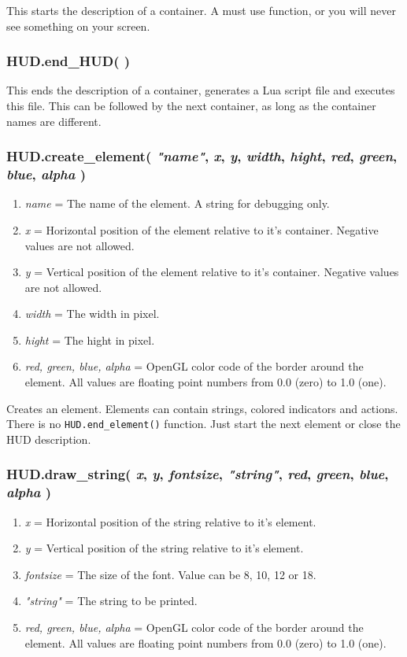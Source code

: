 \documentclass[11pt,parskip=half,a4paper]{scrartcl}
\begin{document}
This starts the description of a container. A must use function, or you will never see something on your screen.

\subsubsection{HUD.end\_HUD( )}

This ends the description of a container, generates a Lua script file and executes this file. This can be followed by the next container, as long as the container names are different.

\subsubsection{HUD.create\_element(  \emph{"name"}, \emph{x}, \emph{y}, \emph{width}, \emph{hight}, \emph{red}, \emph{green}, \emph{blue}, \emph{alpha} )}

\begin{enumerate}
	\item \emph{name} = The name of the element. A string for debugging only.
	\item \emph{x} = Horizontal position of the element relative to it's container. Negative values are not allowed.
	\item \emph{y} = Vertical position of the element relative to it's container. Negative values are not allowed.
	\item \emph{width} = The width in pixel.
	\item \emph{hight} = The hight in pixel.
	\item \emph{red, green, blue, alpha} = OpenGL color code of the border around the element. All values are floating point numbers from 0.0 (zero) to 1.0 (one).
\end{enumerate}

Creates an element. Elements can contain strings, colored indicators and actions. There is no \verb|HUD.end_element()| function. Just start the next element or close the HUD description.

\subsubsection{HUD.draw\_string( \emph{x}, \emph{y}, \emph{fontsize}, \emph{"string"}, \emph{red}, \emph{green}, \emph{blue}, \emph{alpha} )}

\begin{enumerate}
	\item \emph{x} = Horizontal position of the string relative to it's element.
	\item \emph{y} = Vertical position of the string relative to it's element.
	\item \emph{fontsize} = The size of the font. Value can be 8, 10, 12 or 18.
	\item \emph{"string"} = The string to be printed.
	\item \emph{red, green, blue, alpha} = OpenGL color code of the border around the element. All values are floating point numbers from 0.0 (zero) to 1.0 (one).
\end{enumerate}
\end{document}
